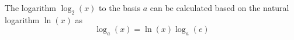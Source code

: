 The logarithm $\log_2(x)$ to the basis $a$ can be calculated based on the natural logarithm $\ln(x)$ as
$$\log_a(x) = \ln(x) \log_a(e)$$

